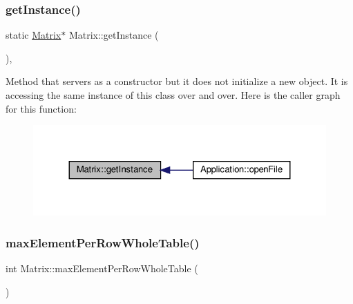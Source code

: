 \subsubsection{\texorpdfstring{get\+Instance()}{getInstance()}}
{\footnotesize\ttfamily static \hyperlink{class_matrix}{Matrix}$\ast$ Matrix\+::get\+Instance (\begin{DoxyParamCaption}{ }\end{DoxyParamCaption})\hspace{0.3cm}{\ttfamily [inline]}, {\ttfamily [static]}}

Method that servers as a constructor but it does not initialize a new object. It is accessing the same instance of this class over and over. Here is the caller graph for this function\+:\nopagebreak
\begin{figure}[H]
\begin{center}
\leavevmode
\includegraphics[width=324pt]{class_matrix_a0c8e09a50ddb4d068d39456ea130abcc_icgraph}
\end{center}
\end{figure}
\mbox{\label{class_matrix_a8620c5426a31cf8fe0072df32bb3f65d}} 
\subsubsection{\texorpdfstring{max\+Element\+Per\+Row\+Whole\+Table()}{maxElementPerRowWholeTable()}}
{\footnotesize\ttfamily int Matrix\+::max\+Element\+Per\+Row\+Whole\+Table (\begin{DoxyParamCaption}{ }\end{DoxyParamCaption})\hspace{0.3cm}{\ttfamily [private]}}

